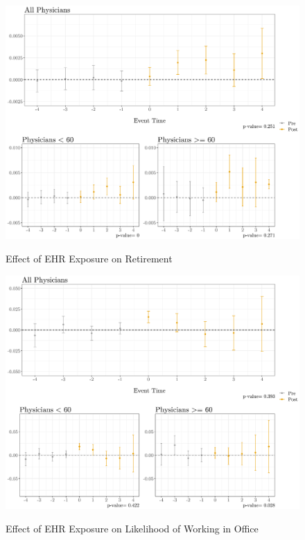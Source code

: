 \documentclass[11pt]{article}
\begin{document}
\begin{figure}[p]
    \centering
    \caption{Effect of EHR Exposure on Retirement}
    \includegraphics[scale=.4]{Objects/retire_plot.pdf}
    \label{fig:retirefirst}
\end{figure}

\begin{figure}[p]
    \centering
    \caption{Effect of EHR Exposure on Likelihood of Working in Office}
    \includegraphics[scale=.4]{Objects/officeind_plot.pdf}
    \label{fig:officefirst}
\end{figure}
\end{document}
